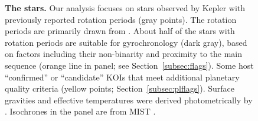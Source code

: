 \documentclass[11pt,twocolumn,tighten]{aastex63}
\begin{document}
\begin{figure}[!t]
	\begin{center}
	
		\vspace{-0.3cm}
	\end{center}
	\vspace{-0.5cm}
  \caption{{\bf The stars.}  Our analysis focuses on stars observed by
  Kepler with previously reported rotation periods (gray points).  The
  rotation periods are primarily drawn from
  \citet{Santos_2019,Santos_2021}.  About half of the stars with
  rotation periods are suitable for gyrochronology (dark gray),
  based on factors including their non-binarity and proximity to the
  main sequence (orange line in  panel; see
  Section~\ref{subsec:flags}).  Some host ``confirmed'' or
  ``candidate'' KOIs that meet additional planetary quality criteria
  (yellow points; Section~\ref{subsec:plflags}).  Surface gravities
  and effective temperatures were derived photometrically by
  \citet{Berger_2020a_catalog}.  Isochrones in the  panel are
  from MIST \citep{Choi_2016}.
	}
	\label{fig:stellarprops}
\end{figure}
\end{document}
